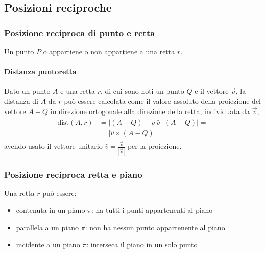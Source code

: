 \documentclass[letterpaper,10pt,italian]{jupyterBook}
\begin{document}
\subsection{Posizioni reciproche}
\label{\detokenize{ch/analytic_geometry/analytic_geometry_3d/lines:posizioni-reciproche}}

\subsubsection{Posizione reciproca di punto e retta}
\label{\detokenize{ch/analytic_geometry/analytic_geometry_3d/lines:posizione-reciproca-di-punto-e-retta}}
\sphinxAtStartPar
Un punto \(P\) o appartiene o non appartiene a una retta \(r\).


\paragraph{Distanza punto\sphinxhyphen{}retta}
\label{\detokenize{ch/analytic_geometry/analytic_geometry_3d/lines:distanza-punto-retta}}
\sphinxAtStartPar
Dato un punto \(A\) e una retta \(r\), di cui sono noti un punto \(Q\) e il vettore \(\vec{v}\), la distanza di \(A\) da \(r\) può essere calcolata come il valore assoluto della proiezione del vettore \(A-Q\) in direzione ortogonale alla direzione della retta, individuata da \(\vec{v}\),
\begin{equation*}
\begin{split}\begin{aligned}
\text{dist}(A,r) & = \left| (A-Q) - \hat{v} \ \hat{v} \cdot (A-Q) \right| = \\ 
                 & = \left| \hat{v} \times (A-Q) \right| 
\end{aligned}\end{split}
\end{equation*}
\sphinxAtStartPar
avendo usato il vettore unitario \(\hat{v} = \frac{\vec{v}}{|\vec{v}|}\) per la proiezione.


\subsubsection{Posizione reciproca retta e piano}
\label{\detokenize{ch/analytic_geometry/analytic_geometry_3d/lines:posizione-reciproca-retta-e-piano}}
\sphinxAtStartPar
Una retta \(r\) può essere:
\begin{itemize}
\item {} 
\sphinxAtStartPar
contenuta in un piano \(\pi\): ha tutti i punti appartenenti al piano

\item {} 
\sphinxAtStartPar
parallela a un piano \(\pi\): non ha nessun punto appartenente al piano

\item {} 
\sphinxAtStartPar
incidente a un piano \(\pi\): interseca il piano in un solo punto

\end{itemize}
\end{document}
